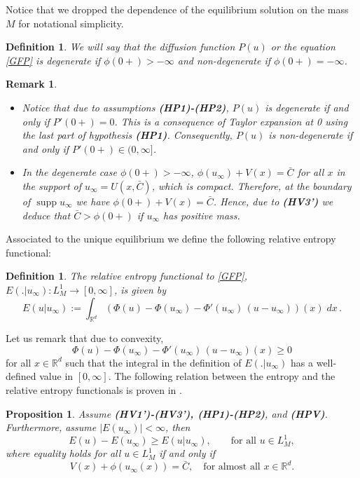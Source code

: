 \documentclass[reqno]{amsart}
\newtheorem{remark}[lemma]{Remark}
\newtheorem{prop}[lemma]{Proposition}
\newtheorem{definition}[lemma]{Definition}
\newcommand{\R}{\mathbb{R}}
\newcommand{\uinf}{u_\infty}
\DeclareMathOperator{\supp}{supp}
\begin{document}
Notice that we dropped the dependence of the equilibrium solution on the mass $M$ for notational simplicity. 

\begin{definition}\label{degversusnondeg}
We will say that the diffusion function $P(u)$ or the equation \eqref{GFP} is degenerate if $\phi(0+)>-\infty$ and non-degenerate if $\phi(0+)=-\infty$.
\end{definition}

\begin{remark}\label{degen}\
\begin{itemize}
\item [(a)] Notice that due to assumptions {\bf (HP1)-(HP2)}, $P(u)$ is degenerate if and only if $P'(0+)=0$. This is a consequence of Taylor expansion at 0 using the last part of hypothesis {\bf (HP1)}. Consequently, $P(u)$ is non-degenerate if and only if $P'(0+)\in(0,\infty]$.

\item [(b)] In the degenerate case $\phi(0+)>-\infty$, $\phi(\uinf)+V(x)=\bar C$ for all $x$ in the support of $\uinf=U(x,\bar C)$, which is compact. Therefore, at the boundary of $\supp\uinf$ we have $\phi(0+)+V(x)=\bar C$. Hence, due to {\bf (HV3')} we deduce that $\bar C> \phi(0+)$ if $\uinf$ has positive mass.
\end{itemize}
\end{remark}

Associated to the unique equilibrium we define the following relative entropy functional:

\begin{definition}\label{standrelentropy}
The relative entropy functional to \eqref{GFP}, $E(.|\uinf) :  L^1_M  \to [0,\infty]$, is given by
$$
 E(u|\uinf) := \int_{\R^d} (\Phi(u)-\Phi(\uinf)
- \Phi'(\uinf)\,(u-\uinf))(x)\;dx\,.
$$
\end{definition}

Let us remark that due to convexity, 
\[ 
\Phi(u)-\Phi(u_{\infty})
- \Phi'(u_{\infty})\,(u-u_{\infty})(x)\ge0
\]
for all $x\in\R^d$ such that the integral in the definition of $E(.|\uinf)$ has a well-defined value in $[0,\infty]$. The following relation between the entropy and the relative entropy functionals is proven in \cite{CJMTU}.

\begin{prop}\label{key} 
Assume {\bf (HV1')-(HV3'), (HP1)-(HP2)}, and {\bf (HPV)}. Furthermore, assume $|E(\uinf)|<\infty$, then
\begin{equation}\label{superkey}
E(u)-E(\uinf)\ge E(u|\uinf), \qquad \mbox{for all } u\in L^1_M,
\end{equation}
where equality holds for all $u\in L^1_M$ if and only if 
\[ V(x) + \phi(\uinf(x)) = \bar C,\quad\mbox{for almost all $x\in\R^d$}.\]
\end{prop}
\end{document}
